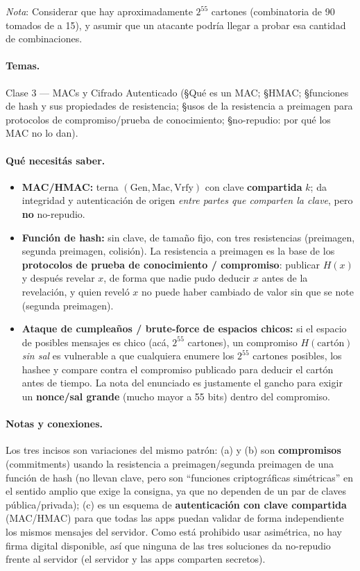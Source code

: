 \begin{consigna}
\emph{Nota}: Considerar que hay aproximadamente $2^{55}$ cartones (combinatoria de 90
tomados de a 15), y asumir que un atacante podría llegar a probar esa cantidad de
combinaciones.
\end{consigna}

\paragraph{Temas.}
Clase 3 --- MACs y Cifrado Autenticado (\S Qué es un MAC; \S HMAC; \S funciones de hash y
sus propiedades de resistencia; \S usos de la resistencia a preimagen para protocolos de
compromiso/prueba de conocimiento; \S no-repudio: por qué los MAC no lo dan).

\paragraph{Qué necesitás saber.}
\begin{itemize}
  \item \textbf{MAC/HMAC:} terna $(\mathrm{Gen},\mathrm{Mac},\mathrm{Vrfy})$ con clave
  \textbf{compartida} $k$; da integridad y autenticación de origen \emph{entre partes que
  comparten la clave}, pero \textbf{no} no-repudio.
  \item \textbf{Función de hash:} sin clave, de tamaño fijo, con tres resistencias
  (preimagen, segunda preimagen, colisión). La resistencia a preimagen es la base de los
  \textbf{protocolos de prueba de conocimiento / compromiso}: publicar $H(x)$ y después
  revelar $x$, de forma que nadie pudo deducir $x$ antes de la revelación, y quien reveló
  $x$ no puede haber cambiado de valor sin que se note (segunda preimagen).
  \item \textbf{Ataque de cumpleaños / brute-force de espacios chicos:} si el espacio de
  posibles mensajes es chico (acá, $2^{55}$ cartones), un compromiso $H(\text{cartón})$
  \emph{sin sal} es vulnerable a que cualquiera enumere los $2^{55}$ cartones posibles,
  los hashee y compare contra el compromiso publicado para deducir el cartón antes de
  tiempo. La nota del enunciado es justamente el gancho para exigir un \textbf{nonce/sal
  grande} (mucho mayor a 55 bits) dentro del compromiso.
\end{itemize}

\paragraph{Notas y conexiones.}
Los tres incisos son variaciones del mismo patrón: (a) y (b) son \textbf{compromisos}
(commitments) usando la resistencia a preimagen/segunda preimagen de una función de hash
(no llevan clave, pero son ``funciones criptográficas simétricas'' en el sentido amplio
que exige la consigna, ya que no dependen de un par de claves pública/privada); (c) es un
esquema de \textbf{autenticación con clave compartida} (MAC/HMAC) para que todas las apps
puedan validar de forma independiente los mismos mensajes del servidor. Como está prohibido
usar asimétrica, no hay firma digital disponible, así que ninguna de las tres soluciones
da no-repudio frente al servidor (el servidor y las apps comparten secretos).

